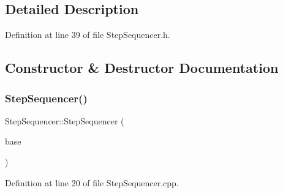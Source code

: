 \subsection{Detailed Description}


Definition at line 39 of file Step\+Sequencer.\+h.



\subsection{Constructor \& Destructor Documentation}
\mbox{\label{class_step_sequencer_a552647854b6f7c5d653432774c357f3e}} 
\subsubsection{\texorpdfstring{Step\+Sequencer()}{StepSequencer()}}
{\footnotesize\ttfamily Step\+Sequencer\+::\+Step\+Sequencer (\begin{DoxyParamCaption}\item[{\hyperlink{class_step_sequencer_base}{Step\+Sequencer\+Base} $\ast$}]{base }\end{DoxyParamCaption})}



Definition at line 20 of file Step\+Sequencer.\+cpp.

